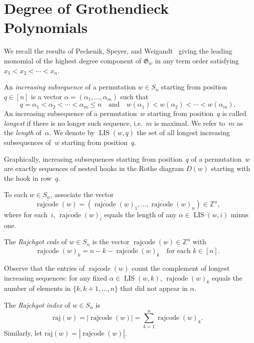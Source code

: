 \documentclass[ALCO]{cedram}
\newcommand{\absrajcode}[1]{\mathrm{raj}(#1)}
\newcommand{\absoverrajcode}[1]{\overline{\mathrm{raj}}(#1)}
\DeclareMathOperator{\LIS}{\mathrm{LIS}}
\DeclareMathOperator{\rr}{\mathrm{rajcode}}
\newcommand{\orr}{\overline{\rr}}
\begin{document}
\section{Degree of Grothendieck Polynomials}
\label{sec:PSW}

We recall the results of Pechenik, Speyer, and Weigandt~\cite{PSW} giving the leading monomial of the highest degree component of $\mathfrak{G}_w$ in any term order satisfying $x_1< x_2<\cdots< x_n$.

\begin{definition}\label{def:1}
	An \emph{increasing subsequence} of a permutation $w\in S_n$ starting from position $q\in [n]$ is a vector $\alpha=(\alpha_1,\ldots,\alpha_m)$ such that
	\[q=\alpha_1<\alpha_2<\cdots<\alpha_m\leq n \quad \mbox{and}\quad w(\alpha_1)<w(\alpha_2)<\cdots<w(\alpha_m).\] 
	An increasing subsequence of a permutation~$w$ starting from position~$q$ is called \emph{longest} if there is no longer such sequence, i.e.~$m$ is maximal. We refer to~$m$ as the \emph{length} of~$\alpha$. We denote by $\LIS(w,q)$ the set of all longest increasing subsequences of~$w$ starting from position~$q$.
\end{definition}

Graphically, increasing subsequences starting from position~$q$ of a permutation~$w$ are exactly sequences of nested hooks in the Rothe diagram $D(w)$ starting with the hook in row~$q$.

\begin{definition}
	To each $w\in S_n$, associate the vector 
	\[\orr(w)=(\orr(w)_1,\ldots,\orr(w)_n)\in\mathbb{Z}^n,\]
	where for each~$i$, $\orr(w)_i$ equals the length of any $\alpha\in \LIS(w,i)$ minus one. 
\end{definition}

\begin{definition}
	The \emph{Rajchgot code} of $w\in S_n$ is the vector $\rr(w)\in \mathbb{Z}^n$ with 
	\[\rr(w)_k = n-k - \orr(w)_k \quad\mbox{for each } k\in [n]. \]
\end{definition}

Observe that the entries of $\rr(w)$ count the complement of longest increasing sequences: for any fixed $\alpha\in\LIS(w,k)$, $\rr(w)_k$ equals the number of elements in $\{k,k+1,\ldots,n\}$ that did not appear in $\alpha$.

\begin{definition}
	The \emph{Rajchgot index} of $w\in S_n$ is
	\[\absrajcode{w} = |\rr(w)| = \sum_{k=1}^n \rr(w)_k.\]
	Similarly, let $\absoverrajcode{w} = |\orr(w)|$.
\end{definition}
\end{document}
